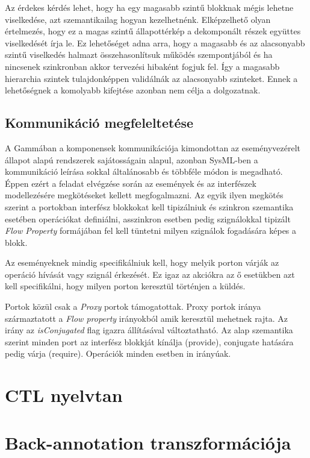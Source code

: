 Az érdekes kérdés lehet, hogy ha egy magasabb szintű blokknak mégis lehetne viselkedése, azt szemantikailag hogyan kezelhetnénk. Elképzelhető olyan értelmezés, hogy ez a magas szintű állapottérkép a dekomponált részek együttes viselkedését írja le. Ez lehetőséget adna arra, hogy a magasabb és az alacsonyabb szintű viselkedés halmazt összehasonlítsuk működés szempontjából és ha nincsenek szinkronban akkor tervezési hibaként fogjuk fel. Így a magasabb hierarchia szintek tulajdonképpen validálnák az alacsonyabb szinteket. Ennek a lehetőségnek a komolyabb kifejtése azonban nem célja a dolgozatnak.

\subsection{Kommunikáció megfeleltetése}

A Gammában a komponensek kommunikációja kimondottan az eseményvezérelt állapot alapú rendszerek sajátosságain alapul, azonban SysML-ben a kommunikáció leírása sokkal általánosabb és többféle módon is megadható. Éppen ezért a feladat elvégzése során az események és az interfészek modellezésére megkötéseket kellett megfogalmazni.
Az egyik ilyen megkötés szerint a portokban interfész blokkokat kell tipizálniuk és szinkron szemantika esetében operációkat definiálni, asszinkron esetben pedig szignálokkal tipizált \emph{Flow Property} formájában fel kell tüntetni milyen szignálok fogadására képes a blokk.

Az eseményeknek mindig specifikálniuk kell, hogy melyik porton várják az operáció hívását vagy szignál érkezését. Ez igaz az akciókra az ő esetükben azt kell specifikálni, hogy milyen porton keresztül történjen a küldés.

Portok közül csak a \emph{Proxy} portok támogatottak. Proxy portok iránya származtatott a \emph{Flow property} irányokból amik keresztül mehetnek rajta. Az irány az \emph{isConjugated} flag igazra állításával változtatható. Az alap szemantika szerint minden port az interfész blokkját kínálja (provide), conjugate hatására pedig várja (require). Operációk minden esetben in irányúak.

\section{CTL nyelvtan}

\section{Back-annotation transzformációja}

